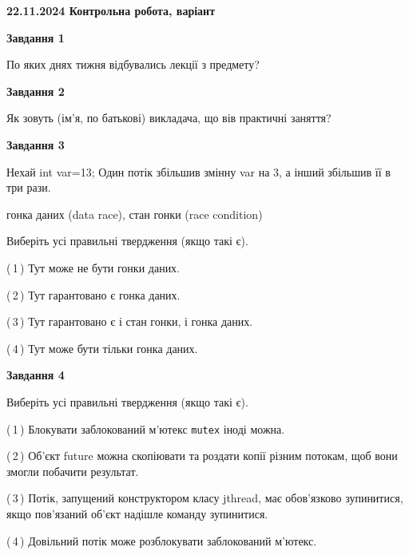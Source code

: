 \documentclass[12pt, ukrainian]{article}
\def\code#1{\Verb!#1!}
\begin{document}
\begin {large}

\textbf{22.11.2024 Контрольна робота, варіант  }\par


{

\begin{center}
\textbf{Завдання 1}
\end{center}

По яких днях тижня відбувались лекції з предмету?


\begin{center}
\textbf{Завдання 2}
\end{center}

Як зовуть (ім'я, по батькові) викладача, що вів практичні заняття?


\begin{center}
\textbf{Завдання 3}
\end{center}

Нехай int var=13; Один потік збільшив змінну var на 3, а інший збільшив її в три рази.

гонка даних (data race), стан гонки (race condition)

Виберіть усі правильні твердження (якщо такі є).\par
\vspace{2mm}
(\,1\,) Тут може не бути гонки даних.%

(\,2\,) Тут гарантовано є гонка даних.%

(\,3\,) Тут гарантовано є і стан гонки, і гонка даних.%

(\,4\,) Тут може бути тільки гонка даних.%


\begin{center}
\textbf{Завдання 4}
\end{center}

Виберіть усі правильні твердження (якщо такі є).\par
\vspace{2mm}

(\,1\,) Блокувати заблокований м’ютекс  \code{mutex} іноді можна.%

(\,2\,) Об’єкт future можна скопіювати та роздати копії різним потокам, щоб вони змогли побачити результат.%

(\,3\,) Потік, запущений конструктором класу jthread, має обов’язково зупинитися, якщо пов’язаний об’єкт надішле команду зупинитися.%

(\,4\,) Довільний потік може розблокувати заблокований м’ютекс.%


}
\end{large}
\end{document}
